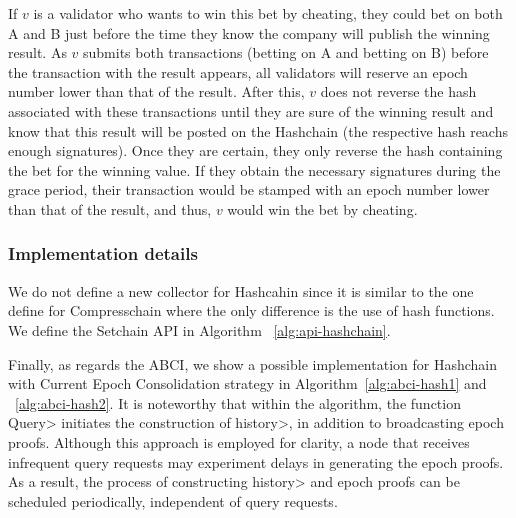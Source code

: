 If $v$ is a validator who wants to win this bet by cheating, they could bet on both
A and B just before the time they know the company will publish the winning result.
As $v$ submits both transactions (betting on A and betting on B) before the transaction
with the result appears, all validators will reserve an epoch number lower than that
of the result. After this, $v$ does not reverse the hash associated with these transactions
until they are sure of the winning result and know that this result will be posted on
the Hashchain (the respective hash reachs enough signatures).
Once they are certain, they only reverse the hash containing the bet for
the winning value. If they obtain the necessary signatures during the grace period,
their transaction would be stamped with an epoch number lower than that of the result,
and thus, $v$ would win the bet by cheating.



\subsubsection{Implementation details}\label{subsubsec:details}

We do not define a new collector for Hashcahin since it is similar to the one
define for Compresschain where the only difference is the use of hash functions.
%
We define the Setchain API in Algorithm ~\ref{alg:api-hashchain}.

Finally, as regards the ABCI, we show a possible implementation for Hashchain
with Current Epoch Consolidation strategy in Algorithm~\ref{alg:abci-hash1} and ~\ref{alg:abci-hash2}. It is
noteworthy that within the algorithm, the function \<Query> initiates the construction
of \<history>, in addition to broadcasting epoch proofs. Although this approach is employed
for clarity, a node that receives infrequent query requests may experiment delays in
generating the epoch proofs. As a result, the process of constructing \<history> and
epoch proofs can be scheduled periodically, independent of query requests.

